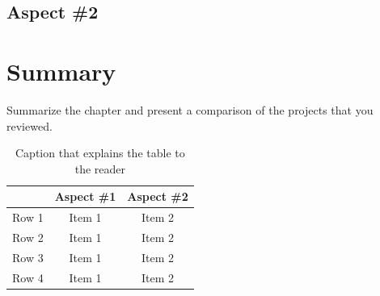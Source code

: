 \subsection{Aspect \#2}

\section{Summary}

Summarize the chapter and present a comparison of the projects that you reviewed.

\begin{table}[!h]
\begin{center}
	\begin{tabular}{|l|c|c|} 
	\hline
 	\bf  & \bf Aspect \#1  & \bf Aspect \#2 \\
  	\hline
	Row 1 & Item 1 & Item 2 \\
	Row 2 & Item 1 & Item 2 \\
	Row 3 & Item 1 & Item 2 \\
	Row 4 & Item 1 & Item 2 \\
	\hline
	\end{tabular}
\end{center}
\caption[Comparison of Closely-Related Projects]{Caption that explains the table to the reader}	
\label{tab:SummaryProjects}
\end{table}
